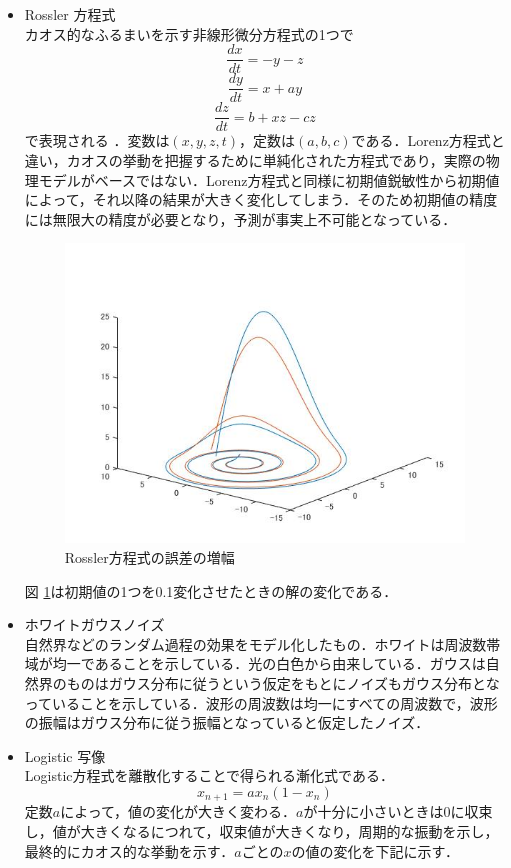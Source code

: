 \documentclass[autodetect-engine,dvipdfmx-if-dvi,ja=standard,a4paper,11pt]{bxjsarticle} %
\begin{document}
\begin{itemize}
\item Rossler 方程式\\
カオス的なふるまいを示す非線形微分方程式の1つで
\begin{equation}
\frac{dx}{dt}=-y-z
\end{equation}
\begin{equation}
\frac{dy}{dt}=x+ay
\end{equation}
\begin{equation}
\frac{dz}{dt}=b+xz-cz
\end{equation}
で表現される \cite{re} ．変数は$(x,y,z,t)$，定数は$(a,b,c)$である．Lorenz方程式と違い，カオスの挙動を把握するために単純化された方程式であり，実際の物理モデルがベースではない．Lorenz方程式と同様に初期値鋭敏性から初期値によって，それ以降の結果が大きく変化してしまう．そのため初期値の精度には無限大の精度が必要となり，予測が事実上不可能となっている．

\begin{figure}[H]%
\begin{center}
\includegraphics[width=.4\textwidth]{Rossler_result.jpg}
\end{center}
\caption{Rossler方程式の誤差の増幅}%
\label{fig:rossler}
\end{figure}

図 \ref{fig:rossler}は初期値の1つを0.1変化させたときの解の変化である．


\item ホワイトガウスノイズ\\
自然界などのランダム過程の効果をモデル化したもの．ホワイトは周波数帯域が均一であることを示している．光の白色から由来している．ガウスは自然界のものはガウス分布に従うという仮定をもとにノイズもガウス分布となっていることを示している．波形の周波数は均一にすべての周波数で，波形の振幅はガウス分布に従う振幅となっていると仮定したノイズ．

\item Logistic 写像\\
Logistic方程式を離散化することで得られる漸化式である．
\begin{equation}
x_{n+1}=ax_{n}(1-x_{n})
\end{equation}
定数$a$によって，値の変化が大きく変わる．$a$が十分に小さいときは0に収束し，値が大きくなるにつれて，収束値が大きくなり，周期的な振動を示し，最終的にカオス的な挙動を示す．$a$ごとの$x$の値の変化を下記に示す．


\end{itemize}
\end{document}
